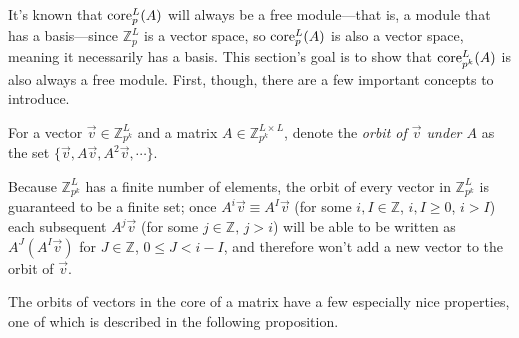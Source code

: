 \documentclass[a4paper, 12pt, reqno]{amsart}
\newcommand\core[3]{\textup{core}_{#1}^{#2}(#3)}
\begin{document}
		It's known that $\core{p}{L}{A}$ will always be a free module---that is, a module that has a basis---since $\mathds{Z}_p^L$ is a vector space, so $\core{p}{L}{A}$ is 
		also a vector space, meaning it necessarily has a basis. This section's goal is to show that $\core{p^k}{L}{A}$ is also always a free module. First, though, there 
		are a few important concepts to introduce.
		
		For a vector $\vec{v} \in \mathds{Z}_{p^k}^L$ and a matrix $A \in \mathds{Z}_{p^k}^{L \times L}$, denote the \emph{orbit of $\vec{v}$ under $A$} as the set
		$\{\vec{v}, A\vec{v}, A^2\vec{v}, \cdots\}$. 
		
		Because $\mathds{Z}_{p^k}^L$ has a finite number of elements, the orbit of every vector in $\mathds{Z}_{p^k}^L$ is guaranteed to be a finite set; once 
		$A^i\vec{v} \equiv A^I\vec{v}$ (for some $i, I \in \mathds{Z}$, $i, I \geq 0$, $i > I$) each subsequent $A^j\vec{v}$ (for some $j \in \mathds{Z},\, j > i$) 
		will be able to be written as $A^J(A^I\vec{v})$ for $J \in \mathds{Z}$, $0 \leq J < i-I$, and therefore won't add a new vector to the orbit of $\vec{v}$.
		
		The orbits of vectors in the core of a matrix have a few especially nice properties, one of which is described in the following proposition.
\end{document}
